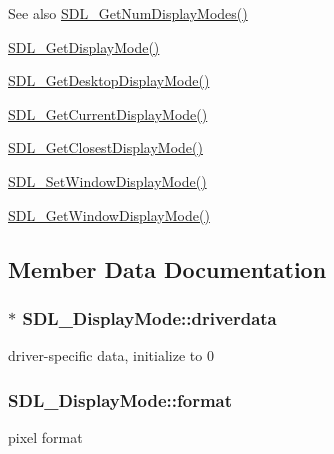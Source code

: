\begin{DoxySeeAlso}{See also}
\hyperlink{_s_d_l__video_8h_a5abcf18592f00019c517e791f8ba53fc}{S\+D\+L\+\_\+\+Get\+Num\+Display\+Modes()} 

\hyperlink{_s_d_l__video_8h_a0a53e003ec6ad24dd2bbbcd0ad297311}{S\+D\+L\+\_\+\+Get\+Display\+Mode()} 

\hyperlink{_s_d_l__video_8h_ab97bca68fc068a6ecc3db473c4c0defd}{S\+D\+L\+\_\+\+Get\+Desktop\+Display\+Mode()} 

\hyperlink{_s_d_l__video_8h_a14dce1cb33085b36f08d27b3d8f2335b}{S\+D\+L\+\_\+\+Get\+Current\+Display\+Mode()} 

\hyperlink{_s_d_l__video_8h_a794be92ee0a9efca226fa19a635fa470}{S\+D\+L\+\_\+\+Get\+Closest\+Display\+Mode()} 

\hyperlink{_s_d_l__video_8h_a2ca17d1e857d1560738e002c9935088a}{S\+D\+L\+\_\+\+Set\+Window\+Display\+Mode()} 

\hyperlink{_s_d_l__video_8h_a8185547bc7cb0bbeb400f459792d081a}{S\+D\+L\+\_\+\+Get\+Window\+Display\+Mode()} 
\end{DoxySeeAlso}


\subsection{Member Data Documentation}
\hypertarget{struct_s_d_l___display_mode_a411f93025411da873f37a384ae62bbcf}{}
\subsubsection[{driverdata}]{$\ast$ S\+D\+L\+\_\+\+Display\+Mode\+::driverdata}\label{struct_s_d_l___display_mode_a411f93025411da873f37a384ae62bbcf}
driver-\/specific data, initialize to 0 \hypertarget{struct_s_d_l___display_mode_ae8120e0a18a99992f039756e1b503680}{}
\subsubsection[{format}]{ S\+D\+L\+\_\+\+Display\+Mode\+::format}\label{struct_s_d_l___display_mode_ae8120e0a18a99992f039756e1b503680}
pixel format \hypertarget{struct_s_d_l___display_mode_a0d9eabed50a560ed553af772c26632d7}{}
